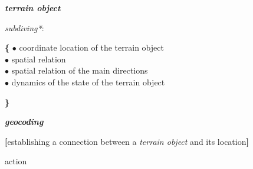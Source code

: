 \documentclass{article}
\begin{document}
\begin{multicols}{2}
   \noindent \textit{\textbf{terrain object}}
    \vspace{-0.3cm}
    \begin{description}[labelwidth=0.5cm, itemsep=-1mm]
        \item[$\Rightarrow$] \textit{subdiving*}: \\
        \vspace{-0.3cm}
        \item[]
        \begin{description}[leftmargin=*]
            \begin{itemize}[leftmargin=*]
                \textbf{\{} \hspace{-2.3mm} $\bullet$ \hspace{4.7mm} coordinate location of the terrain object \\
                $\bullet$ \hspace{0.5cm} spatial relation \\
                $\bullet$ \hspace{5mm} spatial relation of the main directions \\
                $\bullet$ \hspace{0.5cm} dynamics of the state of the terrain object \par
                \hspace{-3mm} \textbf{\}} \\
            \end{itemize}
        \end{description}
    \end{description}
    
    \noindent\textit{\textbf{geocoding}}
    \vspace{-0.3cm}
    \begin{description}[leftmargin=!, labelwidth=1cm, itemsep=-1mm]
        \item[$\coloneqq$] \textbf{[}establishing a connection between a \textit{terrain object} and its location\textbf{]}
        \item[$\subset$] action
    \end{description}


\end{multicols}
\end{document}
